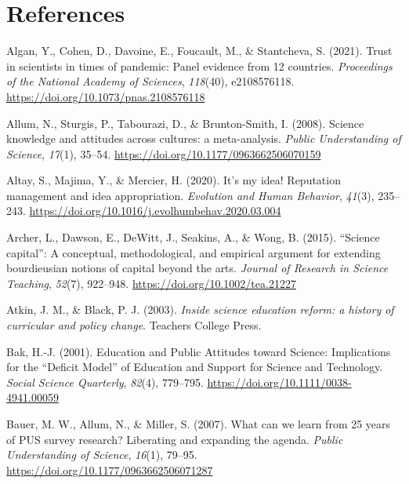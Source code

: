 \documentclass[
  jou,
  floatsintext,
  longtable,
  nolmodern,
  notxfonts,
  notimes,
  colorlinks=true,linkcolor=blue,citecolor=blue,urlcolor=blue]{apa7}
\newlength{\cslhangindent}
\newenvironment{CSLReferences}[2] %
 {\begin{list}{}{%
  \setlength{\itemindent}{0pt}
  \setlength{\leftmargin}{0pt}
  \setlength{\parsep}{0pt}
  \ifodd #1
   \setlength{\leftmargin}{\cslhangindent}
   \setlength{\itemindent}{-1\cslhangindent}
  \fi
  \setlength{\itemsep}{#2\baselineskip}}}
 {\end{list}}
\begin{document}
\section{References}\label{references}

\label{refs}
\begin{CSLReferences}{1}{0}
Algan, Y., Cohen, D., Davoine, E., Foucault, M., \& Stantcheva, S.
(2021). Trust in scientists in times of pandemic: Panel evidence from 12
countries. \emph{Proceedings of the National Academy of Sciences},
\emph{118}(40), e2108576118.
\url{https://doi.org/10.1073/pnas.2108576118}

Allum, N., Sturgis, P., Tabourazi, D., \& Brunton-Smith, I. (2008).
Science knowledge and attitudes across cultures: a meta-analysis.
\emph{Public Understanding of Science}, \emph{17}(1), 35--54.
\url{https://doi.org/10.1177/0963662506070159}

Altay, S., Majima, Y., \& Mercier, H. (2020). It's my idea! Reputation
management and idea appropriation. \emph{Evolution and Human Behavior},
\emph{41}(3), 235--243.
\url{https://doi.org/10.1016/j.evolhumbehav.2020.03.004}

Archer, L., Dawson, E., DeWitt, J., Seakins, A., \& Wong, B. (2015).
{``}Science capital{''}: A conceptual, methodological, and empirical
argument for extending bourdieusian notions of capital beyond the arts.
\emph{Journal of Research in Science Teaching}, \emph{52}(7), 922--948.
\url{https://doi.org/10.1002/tea.21227}

Atkin, J. M., \& Black, P. J. (2003). \emph{Inside science education
reform: a history of curricular and policy change}. Teachers College
Press.

Bak, H.-J. (2001). Education and Public Attitudes toward Science:
Implications for the {``}Deficit Model{''} of Education and Support for
Science and Technology. \emph{Social Science Quarterly}, \emph{82}(4),
779--795. \url{https://doi.org/10.1111/0038-4941.00059}

Bauer, M. W., Allum, N., \& Miller, S. (2007). What can we learn from 25
years of PUS survey research? Liberating and expanding the agenda.
\emph{Public Understanding of Science}, \emph{16}(1), 79--95.
\url{https://doi.org/10.1177/0963662506071287}


\end{CSLReferences}
\end{document}
